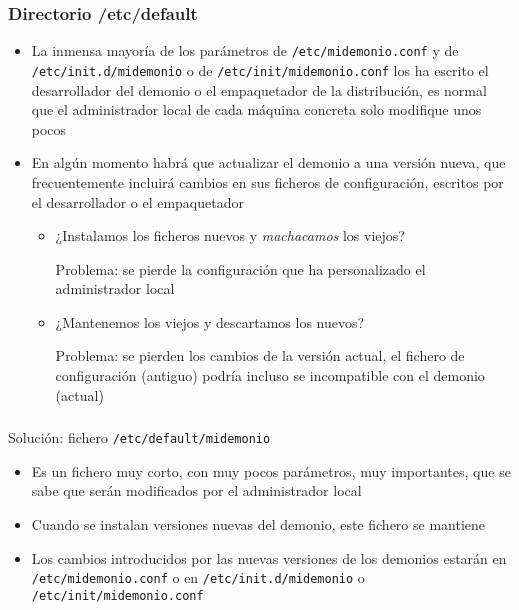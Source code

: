 \documentclass[ucs]{beamer}
\begin{document}
\begin{frame}[fragile]
\frametitle{Directorio /etc/default}
\begin{itemize}
\item
La inmensa mayoría de los parámetros de \verb|/etc/midemonio.conf|
y de 
\verb|/etc/init.d/midemonio|
o de
\verb|/etc/init/midemonio.conf|
los ha escrito el desarrollador del demonio o el empaquetador de
la distribución, es normal que el administrador local
de cada máquina concreta solo modifique unos pocos
\item
En algún momento habrá que actualizar el demonio a una versión nueva,
que frecuentemente incluirá cambios en sus ficheros de configuración,
escritos por el desarrollador o el empaquetador


\begin{itemize}
\item
¿Instalamos los ficheros nuevos y  \emph{machacamos} los viejos?

Problema: se pierde la configuración que ha personalizado el
administrador local
\item
¿Mantenemos los viejos y descartamos los nuevos?

Problema: se pierden los cambios de la versión actual, el fichero
de configuración (antiguo) podría incluso se incompatible con el demonio
(actual)
\end{itemize}
\end{itemize}

\end{frame}



\begin{frame}[fragile]
\frametitle{}
Solución: fichero \verb|/etc/default/midemonio|
\begin{itemize}
\item
Es un fichero muy corto, con muy pocos parámetros, muy importantes,
que se sabe que serán modificados por el administrador local
\item
Cuando se instalan versiones nuevas del demonio, este fichero se mantiene
\item
Los cambios introducidos por las nuevas versiones de los demonios estarán
en \verb|/etc/midemonio.conf| o en 
\verb|/etc/init.d/midemonio|
o 
\verb|/etc/init/midemonio.conf|


\end{itemize}

\end{frame}
\end{document}
